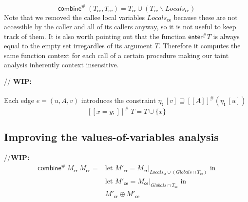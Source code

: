       \[ \textsf{combine}^{\#}\ (T_\textsf{cr}, T_\textsf{ce}) = T_\textsf{cr} \cup (T_\textsf{ce} \backslash Locals_\textsf{ce}) \]
      Note that we removed the callee local variables $Locals_\textsf{ce}$ because these are not accessible by the caller and all of its callers anyway, so it is not useful to keep track of them.
      It is also worth pointing out that the function $\textsf{enter}^{\#} T$ is always equal to the empty set irregardles of its argument $T$. Therefore it computes the same function context for each call of a certain procedure making our taint analysis inherently context insensitive.
      
      // \textbf{WIP:}\\
      \\
      Each edge $e = (u, A, v)$ introduces the constraint $\eta_\textsf{t}\ [v] \sqsupseteq [\![  A ]\!]^{\#}  (\eta_\textsf{t}\ [u]) $\\
      \[ [\![ x = y; ]\!] ^{\#}\ T =  T \cup \{x\} \]


    \subsection{Improving the values-of-variables analysis}
    //\textbf{WIP:}\\
      \begin{align*}
        \textsf{combine}^{\#}\ M_\textsf{cr}\ M_\textsf{ce} = & \text{let } M'_\textsf{cr} = M_\textsf{cr}|_{Locals_\textsf{cr} \cup (Globals \cap T_\textsf{ce})} \text{ in}\\
        & \text{let } M'_\textsf{ce} = M_\textsf{ce}|_{Globals \cap T_\textsf{ce}}\text{ in} \\
        & M'_\textsf{cr} \oplus M'_\textsf{ce}
      \end{align*}

